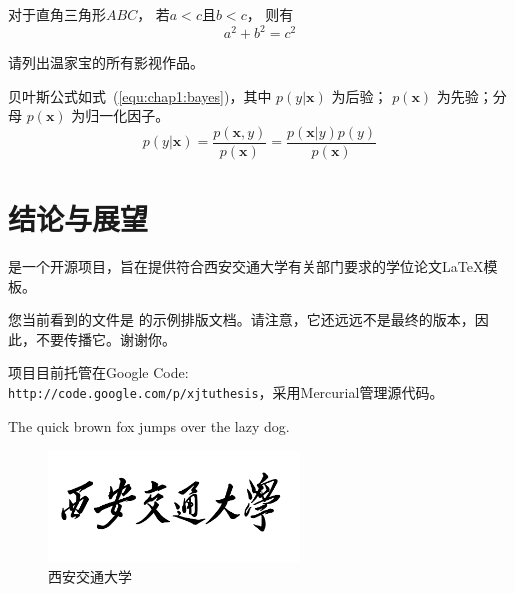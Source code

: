 \documentclass[
    bachelor, 
    ]{xjtuthesis}
\begin{document}
            \begin{theorem}
              \rm 对于直角三角形$ABC$， 若$a<c$且$b<c$， 则有
                \begin{equation}
                  a^2+b^2=c^2
                \end{equation}
            \end{theorem}


            \begin{exercise}
                  \rm 请列出温家宝的所有影视作品。
            \end{exercise}
                
            贝叶斯公式如式~(\ref{equ:chap1:bayes})，其中 $p(y|\mathbf{x})$ 为后验；
            $p(\mathbf{x})$ 为先验；分母 $p(\mathbf{x})$ 为归一化因子。
            \begin{equation}
                \label{equ:chap1:bayes}
                p(y|\mathbf{x}) = \frac{p(\mathbf{x},y)}{p(\mathbf{x})}=
                \frac{p(\mathbf{x}|y)p(y)}{p(\mathbf{x})} 
            \end{equation}


    \chapter{结论与展望}

        \xjtuthesis 是一个开源项目，旨在提供符合西安交通大学有关部门要求的学位论文\LaTeX 模板。

        您当前看到的文件是 \xjtuthesis{} \metaversion 的示例排版文档。请注意，它还远远不是最终的版本，因此，不要传播它。谢谢你。

        \xjtuthesis 项目目前托管在Google Code:\\ \verb|http://code.google.com/p/xjtuthesis|，采用Mercurial管理源代码。


    \xjtuappendix



                The quick brown fox jumps over the lazy dog.

                \begin{figure}[h!]
                  \centering
                  \includegraphics[width=6.67cm]{XJTU.pdf}
                  \caption{西安交通大学}
                  \label{fig:in-appendix}
                \end{figure}
\end{document}
